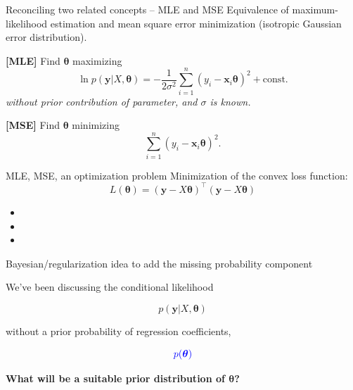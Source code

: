 \documentclass[
  ignorenonframetext,
  aspectratio=169]{beamer}
\begin{document}
\begin{frame}{Reconciling two related concepts -- MLE and MSE}
\protect\hypertarget{reconciling-two-related-concepts-mle-and-mse}{}
Equivalence of maximum-likelihood estimation and mean square error
minimization (isotropic Gaussian error distribution).

\vfill

\textbf{{[}MLE{]}} Find \({\boldsymbol{\theta}}\) maximizing \[
\ln p(\mathbf{y}|X,\boldsymbol{\theta})
= - \frac{1}{2\sigma^{2}} \sum_{i=1}^{n} (y_{i} - \mathbf{x}_{i} \boldsymbol{\theta})^{2} + \textrm{const.}
\] \emph{without prior contribution of parameter, and \(\sigma\) is
known.}

\vfill

\textbf{{[}MSE{]}} Find \(\boldsymbol{\theta}\) minimizing \[
\sum_{i=1}^{n} (y_{i} - \mathbf{x}_{i} \boldsymbol{\theta})^{2}.
\]

\vfill
\end{frame}

\begin{frame}{MLE, MSE, an optimization problem}
\protect\hypertarget{mle-mse-an-optimization-problem}{}
Minimization of the convex loss function: \[
L(\boldsymbol{\theta}) = (\mathbf{y} - X\boldsymbol{\theta})^{\top}(\mathbf{y} - X\boldsymbol{\theta})
\]


\vfill

\begin{itemize}
\item
\item
\item
\end{itemize}
\end{frame}

\begin{frame}{Bayesian/regularization idea to add the missing
probability component}
\protect\hypertarget{bayesianregularization-idea-to-add-the-missing-probability-component}{}
\large

We've been discussing the conditional likelihood

\[p(\mathbf{y}|X,\boldsymbol{\theta})\]

without a prior probability of regression coefficients,

\[{\color{blue} p(\boldsymbol{\theta})}\]

\textbf{What will be a suitable prior distribution of
\(\boldsymbol{\theta}\)?}
\end{frame}
\end{document}
